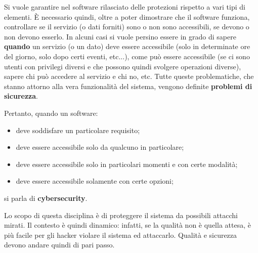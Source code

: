 Si vuole garantire nel software rilasciato delle protezioni rispetto a vari tipi di elementi. È necessario quindi, oltre a poter dimostrare che il software funziona, controllare se il servizio (o dati forniti) sono o non sono accessibili, se devono o non devono esserlo. In alcuni casi si vuole persino essere in grado di sapere \textbf{quando} un servizio (o un dato) deve essere accessibile (solo in determinate ore del giorno, solo dopo certi eventi, etc...), come può essere accessibile (se ci sono utenti con privilegi diversi e che possono quindi svolgere operazioni diverse), sapere chi può accedere al servizio e chi no, etc. Tutte queste problematiche, che stanno attorno alla vera funzionalità del sistema, vengono definite \textbf{problemi di sicurezza}.

Pertanto, quando un software: \begin{itemize}
    \item deve soddisfare un particolare requisito;
    \item deve essere accessibile solo da qualcuno in particolare;
    \item deve essere accessibile solo in particolari momenti e con certe modalità;
    \item deve essere accessibile solamente con certe opzioni;
\end{itemize}

si parla di \textbf{cybersecurity}.

Lo scopo di questa disciplina è di proteggere il sistema da possibili attacchi mirati. Il contesto è quindi dinamico: infatti, se la qualità non è quella attesa, è più facile per gli hacker violare il sistema ed attaccarlo. Qualità e sicurezza devono andare quindi di pari passo.